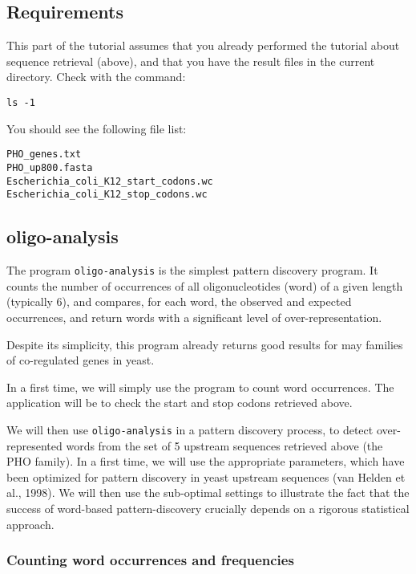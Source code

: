 \subsection{Requirements}
This part of the tutorial assumes that you already performed the
tutorial about sequence retrieval (above), and that you have the
result files in the current directory. Check with the command:

\begin{verbatim}
ls -1
\end{verbatim}

You should see the following file list:
\begin{verbatim}
PHO_genes.txt
PHO_up800.fasta
Escherichia_coli_K12_start_codons.wc
Escherichia_coli_K12_stop_codons.wc
\end{verbatim}

\subsection{oligo-analysis}

The program \texttt{oligo-analysis} is the simplest pattern discovery
program. It counts the number of occurrences of all oligonucleotides
(word) of a given length (typically 6), and compares, for each word,
the observed and expected occurrences, and return words with a
significant level of over-representation.  

Despite its simplicity, this program already returns good results for
may families of co-regulated genes in yeast.

In a first time, we will simply use the program to count word
occurrences. The application will be to check the start and stop
codons retrieved above. 

We will then use \texttt{oligo-analysis} in a pattern discovery
process, to detect over-represented words from the set of 5 upstream
sequences retrieved above (the PHO family).  In a first time, we will
use the appropriate parameters, which have been optimized for pattern
discovery in yeast upstream sequences (van Helden et al., 1998). We
will then use the sub-optimal settings to illustrate the fact that the
success of word-based pattern-discovery crucially depends on a
rigorous statistical approach.

\subsubsection{Counting word occurrences and frequencies}


